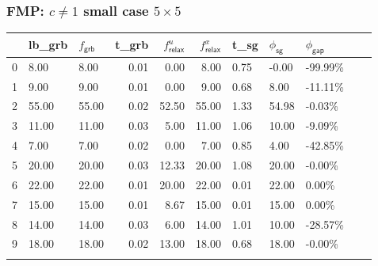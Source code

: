 \begin{frame}
  \frametitle{FMP: \(c \neq 1\) small case \(5 \times 5\)}
  \scriptsize
  \begin{tabular}{lllrrrlllll}
    \toprule
    {} & lb\_grb                  & \(f_{\textsf{grb}}\)     & t\_grb
       & \(f^u_{\textsf{relax}}\) & \(f^x_{\textsf{relax}}\)
       & t\_sg                    & \(\phi_{\textsf{sg}}\)   & \(\phi_{\textsf{gap}}\)                                           \\
    \midrule
    0  & 8.00                     & 8.00                     & 0.01                    & 0.00  & 8.00  & 0.75 & -0.00 & -99.99\% \\
    1  & 9.00                     & 9.00                     & 0.01                    & 0.00  & 9.00  & 0.68 & 8.00  & -11.11\% \\
    2  & 55.00                    & 55.00                    & 0.02                    & 52.50 & 55.00 & 1.33 & 54.98 & -0.03\%  \\
    3  & 11.00                    & 11.00                    & 0.03                    & 5.00  & 11.00 & 1.06 & 10.00 & -9.09\%  \\
    4  & 7.00                     & 7.00                     & 0.02                    & 0.00  & 7.00  & 0.85 & 4.00  & -42.85\% \\
    5  & 20.00                    & 20.00                    & 0.03                    & 12.33 & 20.00 & 1.08 & 20.00 & -0.00\%  \\
    6  & 22.00                    & 22.00                    & 0.01                    & 20.00 & 22.00 & 0.01 & 22.00 & 0.00\%   \\
    7  & 15.00                    & 15.00                    & 0.01                    & 8.67  & 15.00 & 0.01 & 15.00 & 0.00\%   \\
    8  & 14.00                    & 14.00                    & 0.03                    & 6.00  & 14.00 & 1.01 & 10.00 & -28.57\% \\
    9  & 18.00                    & 18.00                    & 0.02                    & 13.00 & 18.00 & 0.68 & 18.00 & -0.00\%  \\
    \bottomrule
    \normalsize
  \end{tabular}
\end{frame}

